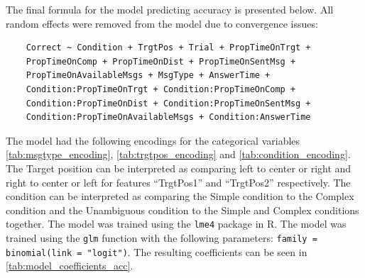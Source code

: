 The final formula for the model predicting accuracy is presented below. All random effects were removed from the model due to convergence issues:
\begin{verbatim}
    Correct ~ Condition + TrgtPos + Trial + PropTimeOnTrgt +
    PropTimeOnComp + PropTimeOnDist + PropTimeOnSentMsg + 
    PropTimeOnAvailableMsgs + MsgType + AnswerTime + 
    Condition:PropTimeOnTrgt + Condition:PropTimeOnComp +
    Condition:PropTimeOnDist + Condition:PropTimeOnSentMsg +
    Condition:PropTimeOnAvailableMsgs + Condition:AnswerTime
\end{verbatim}
The model had the following encodings for the categorical variables \autoref{tab:msgtype_encoding}, \autoref{tab:trgtpos_encoding} and \autoref{tab:condition_encoding}. The Target position can be interpreted as comparing left to center or right and right to center or left for features ``TrgtPos1'' and ``TrgtPos2'' respectively. The condition can be interpreted as comparing the Simple condition to the Complex condition and the Unambiguous condition to the Simple and Complex conditions together. The model was trained using the \texttt{lme4} package in R. The model was trained using the \texttt{glm} function with the following parameters: \texttt{family = binomial(link = "logit")}. The resulting coefficients can be seen in \autoref{tab:model_coefficients_acc}. 

